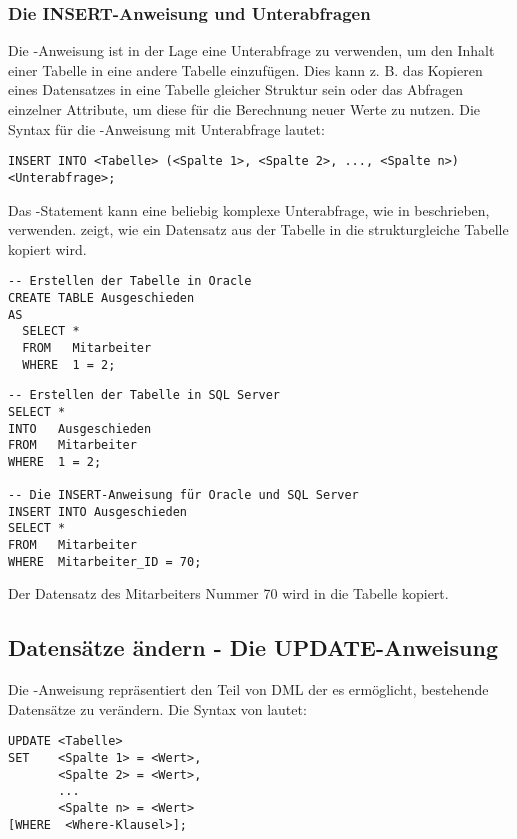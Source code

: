         \subsubsection{Die INSERT-Anweisung und Unterabfragen}
          Die \INSERT-Anweisung ist in der Lage eine Unterabfrage zu verwenden,
          um den Inhalt einer Tabelle in eine andere Tabelle einzuf\"ugen. Dies
          kann z. B. das Kopieren eines Datensatzes in eine Tabelle gleicher
          Struktur sein oder das Abfragen einzelner Attribute, um diese f\"ur
          die Berechnung neuer Werte zu nutzen. Die Syntax f\"ur die
          \INSERT-Anweisung mit Unterabfrage lautet:
          \begin{lstlisting}[language=oracle_sql,caption={Die \INSERT-Anweisung mit Unterabfrage},label=sql07_07]
INSERT INTO <Tabelle> (<Spalte 1>, <Spalte 2>, ..., <Spalte n>)
<Unterabfrage>;
          \end{lstlisting}
          Das \INSERT-Statement kann eine beliebig komplexe Unterabfrage, wie in
           beschrieben, verwenden. 
          zeigt, wie ein Datensatz aus der Tabelle  in
          die strukturgleiche Tabelle  kopiert wird.
          \begin{lstlisting}[language=oracle_sql,caption={Die \INSERT-Anweisung
      mit Unterabfrage},label=sql07_08]
-- Erstellen der Tabelle in Oracle
CREATE TABLE Ausgeschieden
AS
  SELECT *
  FROM   Mitarbeiter
  WHERE  1 = 2;
          \end{lstlisting}
\clearpage
          \begin{lstlisting}[language=oracle_sql]
-- Erstellen der Tabelle in SQL Server
SELECT *
INTO   Ausgeschieden
FROM   Mitarbeiter
WHERE  1 = 2;

-- Die INSERT-Anweisung für Oracle und SQL Server
INSERT INTO Ausgeschieden
SELECT *
FROM   Mitarbeiter
WHERE  Mitarbeiter_ID = 70;
          \end{lstlisting}
          Der Datensatz des Mitarbeiters Nummer 70 wird in die Tabelle
           kopiert.
      \subsection{Datens\"atze \"andern - Die UPDATE-Anweisung}
        Die \UPDATE-Anweisung repr\"asentiert den Teil von DML der es
        erm\"oglicht, bestehende Datens\"atze zu ver\"andern. Die Syntax von
        \UPDATE{} lautet:
        \begin{lstlisting}[language=oracle_sql,caption={Die Syntax des \UPDATE-Kommandos},label=sql07_09]
UPDATE <Tabelle>
SET    <Spalte 1> = <Wert>,
       <Spalte 2> = <Wert>,
       ...
       <Spalte n> = <Wert>
[WHERE  <Where-Klausel>];
        \end{lstlisting}

